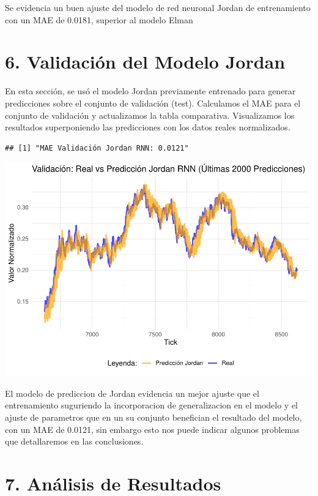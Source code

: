 \documentclass[
]{book}
\begin{document}
Se evidencia un buen ajuste del modelo de red neuronal Jordan de entrenamiento con un MAE de 0.0181, superior al modelo Elman

\section{6. Validación del Modelo Jordan}\label{validaciuxf3n-del-modelo-jordan}

En esta sección, se usó el modelo Jordan previamente entrenado para generar predicciones sobre el conjunto de validación (test). Calculamos el MAE para el conjunto de validación y actualizamos la tabla comparativa. Visualizamos los resultados superponiendo las predicciones con los datos reales normalizados.

\begin{verbatim}
## [1] "MAE Validación Jordan RNN: 0.0121"
\end{verbatim}

\includegraphics{bookdown_time_series_files/figure-latex/rnn-8-1.pdf}

El modelo de prediccion de Jordan evidencia un mejor ajuste que el entrenamiento suguriendo la incorporacion de generalizacion en el modelo y el ajuste de parametros que en un su conjunto benefician el resultado del modelo, con un MAE de 0.0121, sin embargo esto nos puede indicar algunos problemas que detallaremos en las conclusiones.

\section{7. Análisis de Resultados}\label{anuxe1lisis-de-resultados}
\end{document}
